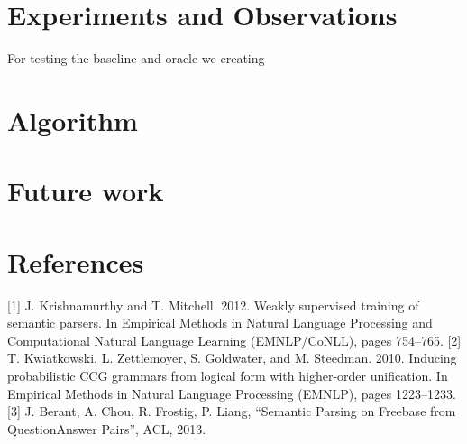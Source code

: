 \documentclass[12pt, a4paper]{article}
\begin{document}
\section{Experiments and Observations}
For testing the baseline and oracle we creating

\section{Algorithm}




\section{Future work}

\section{References}
[1] J. Krishnamurthy and T. Mitchell. 2012. Weakly supervised training of semantic parsers. In Empirical Methods in Natural Language Processing and Computational Natural Language Learning (EMNLP/CoNLL), pages 754–765.
[2] T. Kwiatkowski, L. Zettlemoyer, S. Goldwater, and M. Steedman. 2010. Inducing probabilistic CCG grammars from logical form with higher-order unification. In Empirical Methods in Natural Language Processing (EMNLP), pages 1223–1233.
[3] J. Berant, A. Chou, R. Frostig, P. Liang, “Semantic Parsing on Freebase from QuestionAnswer Pairs”, ACL, 2013.
\end{document}
